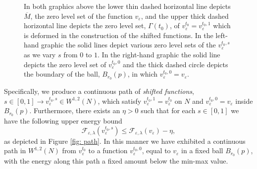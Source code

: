 \documentclass[11pt]{article}
\begin{document}
\begin{figure}[H]
\caption{In both graphics above the lower thin dashed horizontal line depicts $\overline{M}$, the zero level set of the function $v_\varepsilon$, and the upper thick dashed horizontal line depicts the zero level set, $\Gamma(t_0)$, of $v^{t_0}_\varepsilon = v^{t_0,1}_\varepsilon$ which is deformed in the construction of the shifted functions. In the left-hand graphic the solid lines depict various zero level sets of the $v^{t_0,s}_\varepsilon$ as we vary $s$ from $0$ to $1$. In the right-hand graphic the solid line depicts the zero level set of $v^{t_0,0}_\varepsilon$ and the thick dashed circle depicts the boundary of the ball, $B_{r_0}(p)$, in which $v^{t_0,0}_\varepsilon = v_\varepsilon$.}
\label{fig: shifting functions I}
\end{figure}
Specifically, we produce a continuous path of \textit{shifted functions}, $s \in [0,1] \rightarrow v^{t_0,s}_\varepsilon \in W^{1,2}(N)$, which satisfy $v^{t_0,1}_\varepsilon = v^{t_0}_\varepsilon$ on $N$ and $v^{t_0,0}_\varepsilon = v_\varepsilon$ inside $B_{r_0}(p)$. Furthermore, there exists an $\eta > 0$ such that for each $s \in [0,1]$ we have the following upper energy bound
    \begin{equation*}
        \mathcal{F}_{\varepsilon,\lambda}(v^{t_0,s}_\varepsilon) \leq \mathcal{F}_{\varepsilon,\lambda}(v_\varepsilon) - \eta,
    \end{equation*}
as depicted in Figure \ref{fig: path}. In this manner we have exhibited a continuous path in $W^{1,2}(N)$ from $v^{t_0}_\varepsilon$ to a function $v^{t_0,0}_\varepsilon$, equal to $v_\varepsilon$ in a fixed ball $B_{r_0}(p)$, with the energy along this path a fixed amount below the min-max value.
\end{document}
